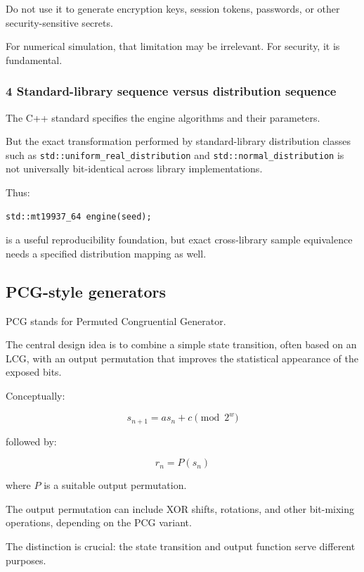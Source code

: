 Do not use it to generate encryption keys, session tokens, passwords, or other security-sensitive secrets.

For numerical simulation, that limitation may be irrelevant. For security, it is fundamental.

\subsubsection{4 Standard-library sequence versus distribution sequence}\label{02-foundations-ii-ch029-standard-library-sequence-versus-distribution-sequence}

The C++ standard specifies the engine algorithms and their parameters.

But the exact transformation performed by standard-library distribution classes such as \texttt{std::uniform\_real\_distribution} and \texttt{std::normal\_distribution} is not universally bit-identical across library implementations.

Thus:

\begin{verbatim}
std::mt19937_64 engine(seed);
\end{verbatim}

is a useful reproducibility foundation, but exact cross-library sample equivalence needs a specified distribution mapping as well.

\subsection{PCG-style generators}\label{02-foundations-ii-ch029-pcg-style-generators}

PCG stands for Permuted Congruential Generator.

The central design idea is to combine a simple state transition, often based on an LCG, with an output permutation that improves the statistical appearance of the exposed bits.

Conceptually:

\[
 \boxed{ s_{n+1}=as_n+c\pmod{2^w} }
\]

followed by:

\[
 \boxed{ r_n=P(s_n) }
\]

where \(P\) is a suitable output permutation.

The output permutation can include XOR shifts, rotations, and other bit-mixing operations, depending on the PCG variant.

The distinction is crucial: the state transition and output function serve different purposes.

